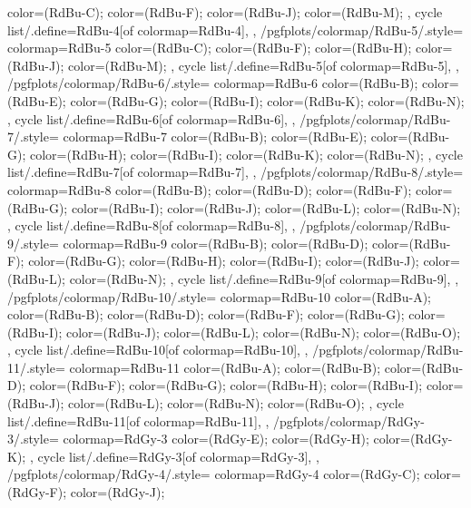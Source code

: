 {{{      color=(RdBu-C);
      color=(RdBu-F);
      color=(RdBu-J);
      color=(RdBu-M);
    },
    cycle list/.define={RdBu-4}{[of colormap=RdBu-4]},
  },
  /pgfplots/colormap/RdBu-5/.style={
    colormap={RdBu-5}{
      color=(RdBu-C);
      color=(RdBu-F);
      color=(RdBu-H);
      color=(RdBu-J);
      color=(RdBu-M);
    },
    cycle list/.define={RdBu-5}{[of colormap=RdBu-5]},
  },
  /pgfplots/colormap/RdBu-6/.style={
    colormap={RdBu-6}{
      color=(RdBu-B);
      color=(RdBu-E);
      color=(RdBu-G);
      color=(RdBu-I);
      color=(RdBu-K);
      color=(RdBu-N);
    },
    cycle list/.define={RdBu-6}{[of colormap=RdBu-6]},
  },
  /pgfplots/colormap/RdBu-7/.style={
    colormap={RdBu-7}{
      color=(RdBu-B);
      color=(RdBu-E);
      color=(RdBu-G);
      color=(RdBu-H);
      color=(RdBu-I);
      color=(RdBu-K);
      color=(RdBu-N);
    },
    cycle list/.define={RdBu-7}{[of colormap=RdBu-7]},
  },
  /pgfplots/colormap/RdBu-8/.style={
    colormap={RdBu-8}{
      color=(RdBu-B);
      color=(RdBu-D);
      color=(RdBu-F);
      color=(RdBu-G);
      color=(RdBu-I);
      color=(RdBu-J);
      color=(RdBu-L);
      color=(RdBu-N);
    },
    cycle list/.define={RdBu-8}{[of colormap=RdBu-8]},
  },
  /pgfplots/colormap/RdBu-9/.style={
    colormap={RdBu-9}{
      color=(RdBu-B);
      color=(RdBu-D);
      color=(RdBu-F);
      color=(RdBu-G);
      color=(RdBu-H);
      color=(RdBu-I);
      color=(RdBu-J);
      color=(RdBu-L);
      color=(RdBu-N);
    },
    cycle list/.define={RdBu-9}{[of colormap=RdBu-9]},
  },
  /pgfplots/colormap/RdBu-10/.style={
    colormap={RdBu-10}{
      color=(RdBu-A);
      color=(RdBu-B);
      color=(RdBu-D);
      color=(RdBu-F);
      color=(RdBu-G);
      color=(RdBu-I);
      color=(RdBu-J);
      color=(RdBu-L);
      color=(RdBu-N);
      color=(RdBu-O);
    },
    cycle list/.define={RdBu-10}{[of colormap=RdBu-10]},
  },
  /pgfplots/colormap/RdBu-11/.style={
    colormap={RdBu-11}{
      color=(RdBu-A);
      color=(RdBu-B);
      color=(RdBu-D);
      color=(RdBu-F);
      color=(RdBu-G);
      color=(RdBu-H);
      color=(RdBu-I);
      color=(RdBu-J);
      color=(RdBu-L);
      color=(RdBu-N);
      color=(RdBu-O);
    },
    cycle list/.define={RdBu-11}{[of colormap=RdBu-11]},
  },
  /pgfplots/colormap/RdGy-3/.style={
    colormap={RdGy-3}{
      color=(RdGy-E);
      color=(RdGy-H);
      color=(RdGy-K);
    },
    cycle list/.define={RdGy-3}{[of colormap=RdGy-3]},
  },
  /pgfplots/colormap/RdGy-4/.style={
    colormap={RdGy-4}{
      color=(RdGy-C);
      color=(RdGy-F);
      color=(RdGy-J);
}}}
